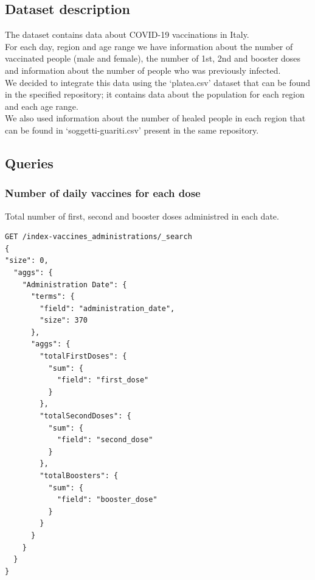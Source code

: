 \documentclass[12pt, a4paper]{article}
\begin{document}
\subsection{Dataset description}

The dataset contains data about COVID-19 vaccinations in Italy. \\
For each day, region and age range we have information about the number of vaccinated 
people (male and female), the number of 1st, 2nd and booster doses and information 
about the number of people who was previously infected. \\
We decided to integrate this data using the ‘platea.csv’ dataset that can be found 
in the specified repository; it contains data about the population for each region 
and each age range. \\ 
We also used information about the number of healed people in each region that can be 
found in ‘soggetti-guariti.csv’ present in the same repository.

\subsection{Queries}

\subsubsection{Number of daily vaccines for each dose}
Total number of first, second and booster doses administred in each date.
\begin{tcolorbox}[fontupper=\scriptsize]
    \begin{verbatim}
GET /index-vaccines_administrations/_search
{
"size": 0, 
  "aggs": {
    "Administration Date": {
      "terms": {
        "field": "administration_date",
        "size": 370
      },
      "aggs": {
        "totalFirstDoses": {
          "sum": {
            "field": "first_dose"
          }
        },        
        "totalSecondDoses": {
          "sum": {
            "field": "second_dose"
          }
        },        
        "totalBoosters": {
          "sum": {
            "field": "booster_dose"
          }
        }
      }
    }
  } 
}

    \end{verbatim}
\end{tcolorbox}

\noindent
\blindtext
\end{document}
